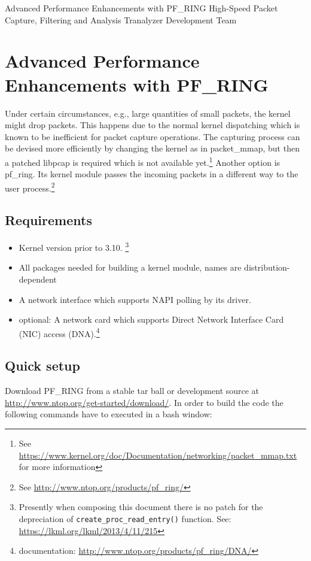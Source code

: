 \documentclass[documentation]{subfiles}
\begin{document}
\trantitle
    {Advanced Performance Enhancements with PF\_RING}
    {High-Speed Packet Capture, Filtering and Analysis} %
    {Tranalyzer Development Team} %

\section{Advanced Performance Enhancements with PF\_RING}
Under certain circumstances, e.g., large quantities of small packets, the kernel might drop packets. This happens due to the normal kernel dispatching which is known to be inefficient for packet capture operations. The capturing process can be devised more efficiently by changing the kernel as in packet\_mmap, but then a patched libpcap is required which is not available yet.\footnote{See \url{https://www.kernel.org/doc/Documentation/networking/packet\_mmap.txt} for more information}
Another option is pf\_ring. Its kernel module passes the incoming packets in a different way to the user process.\footnote{See \url{http://www.ntop.org/products/pf_ring/}}

\subsection*{Requirements}
\begin{itemize}
\item Kernel version prior to 3.10. \footnote{Presently when composing this document there is no patch for the depreciation of {\tt create\_proc\_read\_entry()} function. See: \url{https://lkml.org/lkml/2013/4/11/215}}
\item All packages needed for building a kernel module, names are distribution-dependent
\item A network interface which supports NAPI polling by its driver.
\item optional: A network card which supports Direct Network Interface Card (NIC) access (DNA).\footnote{documentation: \url{http://www.ntop.org/products/pf\_ring/DNA/}}
\end{itemize}

\subsection*{Quick setup}
Download PF\_RING from a stable tar ball or development source at \url{http://www.ntop.org/get-started/download/}. In order to build the code the following
commands have to executed in a bash window:
\end{document}

